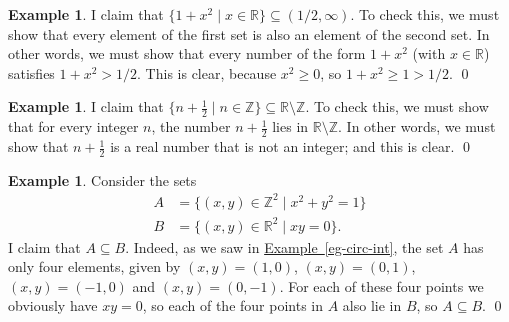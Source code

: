 \documentclass[a4paper]{book}
\newcommand{\Z}         {{\mathbb{Z}}}
\newcommand{\R}         {{\mathbb{R}}}
\newcommand{\sm}        {\setminus}
\newcommand{\sse}       {\subseteq}
\newcommand{\st}        {\;|\;}
\renewcommand{\:}{\colon}
\newcommand{\biref}[2]{\hyperlink{#2}{#1~\ref*{#2}}}
\theoremstyle{definition}
\newtheorem{example}[theorem]{Example}
\begin{document}
\begin{example}
 I claim that $\{1+x^2\st x\in\R\}\sse(1/2,\infty)$.  To check this,
 we must show that every element of the first set is also an element
 of the second set.  In other words, we must show that every number of
 the form $1+x^2$ (with $x\in\R$) satisfies $1+x^2>1/2$.  This is
 clear, because $x^2\geq 0$, so $1+x^2\geq 1>1/2$.  \qed
\end{example}
\begin{example}
 I claim that $\{n+\frac{1}{2}\st n\in\Z\}\sse\R\sm\Z$.  To check
 this, we must show that for every integer $n$, the number
 $n+\frac{1}{2}$ lies in $\R\sm\Z$.  In other words, we must show that
 $n+\frac{1}{2}$ is a real number that is not an integer; and this is
 clear. \qed
\end{example}
\begin{example}
 Consider the sets
 \begin{align*}
  A &= \{(x,y)\in\Z^2\st x^2+y^2=1\} \\
  B &= \{(x,y)\in\R^2\st xy=0\}.
 \end{align*}
 I claim that $A\sse B$.  Indeed, as we saw in
 \biref{Example}{eg-circ-int}, the set $A$ has only four elements, given
 by $(x,y)=(1,0)$, $(x,y)=(0,1)$, $(x,y)=(-1,0)$ and $(x,y)=(0,-1)$.
 For each of these four points we obviously have $xy=0$, so each of
 the four points in $A$ also lie in $B$, so $A\sse B$. \qed
\end{example}
\end{document}
